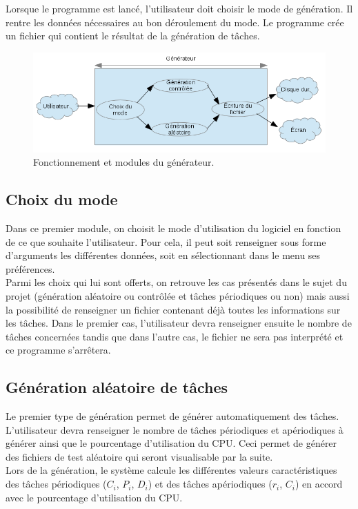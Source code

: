 	
		Lorsque le programme est lancé, l’utilisateur doit choisir le mode de génération. Il rentre les données nécessaires au bon déroulement du mode. Le programme crée un fichier qui contient le résultat de la génération de tâches.
		
			\begin{figure}[!h]
				\centering
				\includegraphics[scale=0.9]{img/schema_gen.png}
				\caption{Fonctionnement et modules du générateur.}
			\end{figure}
			\FloatBarrier
		    
			\subsection{Choix du mode}
				Dans ce premier module, on choisit le mode d’utilisation du logiciel en fonction de ce que souhaite l’utilisateur. Pour cela, il peut soit renseigner sous forme d’arguments les différentes données, soit en sélectionnant dans le menu ses préférences. \\

				Parmi les choix qui lui sont offerts, on retrouve les cas présentés dans le sujet du projet (génération aléatoire ou contrôlée et tâches périodiques ou non) mais aussi la possibilité de renseigner un fichier contenant déjà toutes les informations sur les tâches. Dans le premier cas, l’utilisateur devra renseigner ensuite le nombre de tâches concernées tandis que dans l’autre cas, le fichier ne sera pas interprété et ce programme s’arrêtera.


			\subsection{Génération aléatoire de tâches}
				Le premier type de génération permet de générer automatiquement des tâches. L'utilisateur devra renseigner le nombre de tâches périodiques et apériodiques à générer ainsi que le pourcentage d'utilisation du CPU. Ceci permet de générer des fichiers de test aléatoire qui seront visualisable par la suite.\\
				Lors de la génération, le système calcule les différentes valeurs caractéristiques des tâches périodiques ($C_i$, $P_i$, $D_i$) et des tâches apériodiques ($r_i$, $C_i$) en accord avec le pourcentage d'utilisation du CPU. 

